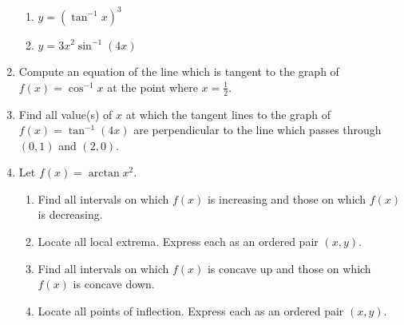 \documentclass[12pt]{article}
\newif\ifans
\begin{document}
\begin{enumerate}
\begin{enumerate}

\item $y=\left(\tan^{-1}x\right)^3$

\ifans\fbox{$\frac{3\left(\tan^{-1}x\right)^2}{1+x^2}$}\fi

\item $y=3x^2\sin^{-1}(4x)$

\ifans\fbox{$\frac{12x^2}{\sqrt{1-16x^2}}+6x\sin^{-1}(4x)$} \fi

\end{enumerate}

\item Compute an equation of the line which is tangent to the graph of $f(x)=\cos^{-1}{x}$ at the point where $x=\frac{1}{2}$.

\ifans{\fbox{$y=-\frac{2}{\sqrt{3}}x+\frac{\pi+\sqrt{3}}{3}$}} \fi

\item Find all value(s) of $x$ at which the tangent lines to the graph of $f(x)=\tan^{-1}{(4x)}$ are perpendicular to the line which passes through $(0,1)$ and $(2,0)$.

\ifans{\fbox{$x=\pm\frac{1}{4}$}} \fi

\item Let $f(x)=\arctan{x^2}$.

\begin{enumerate}

\item Find all intervals on which $f(x)$ is increasing and those on which $f(x)$ is decreasing.

\ifans\fbox{Decreasing on $(-\infty,0)$; Increasing on $(0,\infty)$} \fi

\item Locate all local extrema.  Express each as an ordered pair $(x,y)$.

\ifans\fbox{Local minimum at $(0,0)$; No local maximum} \fi

\item Find all intervals on which $f(x)$ is concave up and those on which $f(x)$ is concave down.

\ifans\fbox{Concave down on $\left(-\infty,-\frac{1}{\sqrt[4]{3}}\right)\cup\left(\frac{1}{\sqrt[4]{3}},\infty\right)$; Concave up on$\left(-\frac{1}{\sqrt[4]{3}},\frac{1}{\sqrt[4]{3}}\right)$} \fi

\item Locate all points of inflection.  Express each as an ordered pair $(x,y)$.


\end{enumerate}
\end{enumerate}
\end{document}
